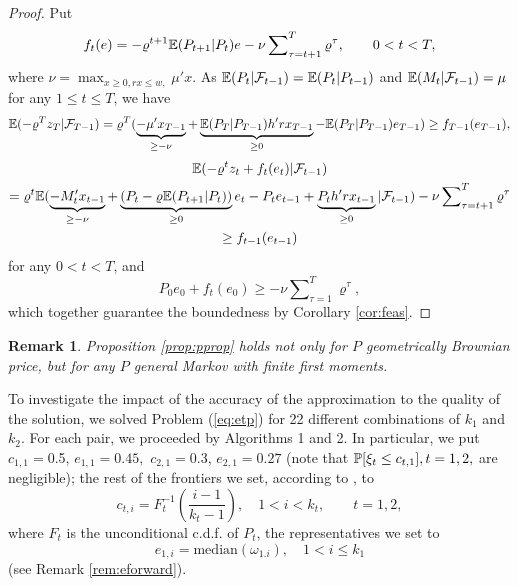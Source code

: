 \documentclass{article}              %
\newtheorem{remark}{Remark}
\begin{document}
\begin{proof}
Put 
\[
f_{t}(e)=-\varrho^{t+1}\E(P_{t+1}|P_{t})e-\nu\sum\nolimits_{\tau=t+1}^{T} \varrho^\tau ,\qquad0<t<T,
\]
where $\nu=\max_{x\geq0,rx\leq w,}\mu'x$. As $\E(P_t|\F_{t-1})=\E(P_t|P_{t-1})$ and 
$\E(M_t|\F_{t-1})=\mu$ for any $1\leq t \leq T$, we have
$$
\E(-\varrho^{T}z_{T}|\F_{T-1})
=\varrho^{T}(\underbrace{-\mu'x_{T-1}}_{\geq -\nu}+\underbrace{\E(P_{T}|P_{T-1})h'rx_{T-1}}_{\geq 0}-\E(P_{T}|P_{T-1})e_{T-1})
\geq
f_{T-1}(e_{T-1}),
$$
\begin{multline*}
\E(-\varrho^{t}z_{t}+f_{t}(e_{t})|\F_{t-1})\\
=\varrho^{t}\E(\underbrace{-M'_{t}x_{t-1}}_{\geq -\nu}+\underbrace{(P_{t}-\varrho\E(P_{t+1}|P_{t}))}_{\geq 0}e_t-P_te_{t-1}+\underbrace{P_th'rx_{t-1}}_{\geq 0}
|\F_{t-1})-\nu\sum\nolimits_{\tau=t+1}^{T} \varrho^\tau\\
\geq
f_{t-1}(e_{t-1})
\end{multline*}
for any $0<t<T$, and
\[
P_{0}e_{0}+f_{t}(e_0)
\geq
-\nu\sum\nolimits_{\tau=1}^{T} \varrho^\tau,
\]
which together guarantee the boundedness by Corollary \ref{cor:feas}.
\end{proof}
\begin{remark}
Proposition \ref{prop:pprop} holds not only for $P$ geometrically
Brownian price, but for any $P$ general Markov with finite first
moments.
\end{remark}

To investigate the impact of the accuracy of the approximation to
the quality of the solution, we solved Problem (\ref{eq:etp}) for 22 different combinations of 
$k_{1}$ and $k_{2}$. For each pair, we proceeded
by Algorithms 1 and 2. In particular, we put $c_{1,1}=$0.5, $e_{1,1}=0.45,$
$c_{2,1}=0.3$, $e_{2,1}=0.27$ (note that $\P[\xi_{t}\leq c_{t,1}],t=1,2,$
are negligible); the rest of the frontiers we set, according to \cite{Smid09c}, to
\[
c_{t,i}=F_{t}^{-1}\left(\frac{i-1}{k_{t}-1}\right),\quad1<i<k_{t},\qquad t=1,2,
\]
where $F_{t}$ is the unconditional c.d.f. of $P_{t}$, the representatives we set to 
$$
e_{1,i}=\mathrm{median}(\omega_{1.i}),\quad1<i\leq k_{1}
$$
(see Remark \ref{rem:eforward}).
\end{document}
